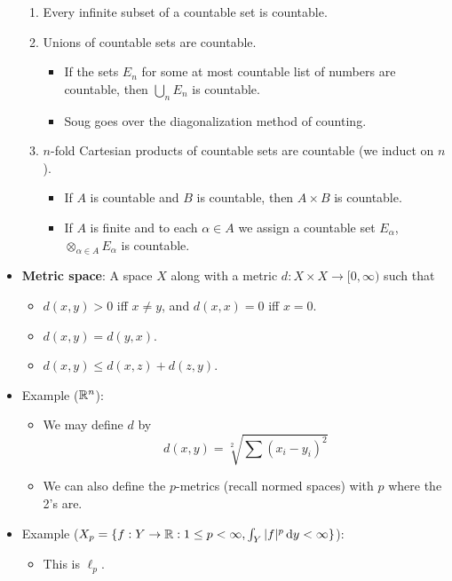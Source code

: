 \documentclass[../../notes.tex]{subfiles}
\begin{document}
\begin{itemize}
    \begin{enumerate}
        \item Every infinite subset of a countable set is countable.
        \item Unions of countable sets are countable.
        \begin{itemize}
            \item If the sets $E_n$ for some at most countable list of numbers are countable, then $\bigcup_nE_n$ is countable.
            \item Soug goes over the diagonalization method of counting.
        \end{itemize}
        \item $n$-fold Cartesian products of countable sets are countable (we induct on $n$).
        \begin{itemize}
            \item If $A$ is countable and $B$ is countable, then $A\times B$ is countable.
            \item If $A$ is finite and to each $\alpha\in A$ we assign a countable set $E_\alpha$, $\otimes_{\alpha\in A}E_\alpha$ is countable.
        \end{itemize}
    \end{enumerate}
    \item \textbf{Metric space}: A space $X$ along with a metric $d:X\times X\to[0,\infty)$ such that
    \begin{itemize}
        \item $d(x,y)>0$ iff $x\neq y$, and $d(x,x)=0$ iff $x=0$.
        \item $d(x,y)=d(y,x)$.
        \item $d(x,y)\leq d(x,z)+d(z,y)$.
    \end{itemize}
    \item Example ($\mathbb{R}^n$):
    \begin{itemize}
        \item We may define $d$ by
        \begin{equation*}
            d(x,y) = \sqrt[2]{\sum(x_i-y_i)^2}
        \end{equation*}
        \item We can also define the $p$-metrics (recall normed spaces) with $p$ where the 2's are.
    \end{itemize}
    \item Example ($X_p=\{f:Y\to\mathbb{R}:1\leq p<\infty,\int_Y|f|^p\dd{y}<\infty\}$):
    \begin{itemize}
        \item This is $\ell_p$.

\end{itemize}
\end{itemize}
\end{document}
